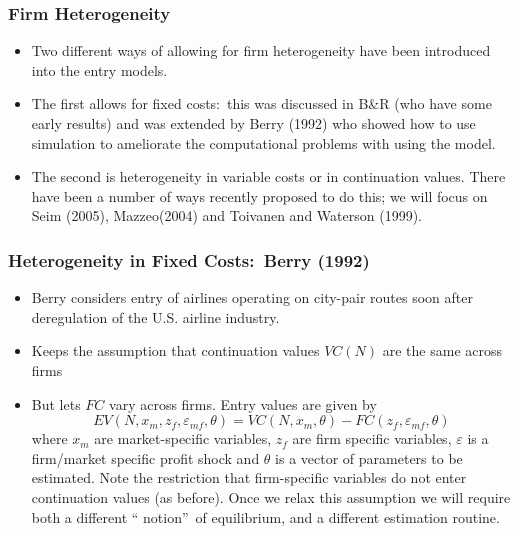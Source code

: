 \documentclass[aspectratio=169,11pt]{beamer}
\begin{document}
\begin{frame}
\frametitle{Firm Heterogeneity}
\begin{itemize}
\item Two different ways of allowing for firm heterogeneity have been
introduced into the entry models.

\item The first allows for fixed costs:\ this was discussed in B\&R (who
have some early results) and was extended by Berry (1992) who showed how to
use simulation to ameliorate the computational problems with using the model.

\item The second is heterogeneity in variable costs or in continuation
values. There have been a number of ways recently proposed to do this; we
will focus on Seim (2005), Mazzeo(2004) and Toivanen and Waterson (1999).
\end{itemize}
\end{frame}%
\begin{frame}%

\frametitle{Heterogeneity in Fixed Costs:\ Berry (1992)}

\begin{itemize}
\item Berry considers entry of airlines operating on city-pair routes soon
after deregulation of the U.S. airline industry.

\item Keeps the assumption that continuation values $VC(N)$ are the same
across firms

\item But lets $FC$ vary across firms. Entry values are given by 
\begin{equation}
EV(N,x_{m},z_{f},\varepsilon _{mf},\theta )=VC(N,x_{m},\theta
)-FC(z_{f},\varepsilon _{mf},\theta )  \label{entry5}
\end{equation}%
where $x_{m}$ are market-specific variables, $z_{f}$ are firm specific
variables, $\varepsilon $ is a firm/market specific profit shock and $\theta 
$ is a vector of parameters to be estimated. Note the restriction that
firm-specific variables do not enter continuation values (as before). Once
we relax this assumption we will require both a different \textquotedblleft
notion\textquotedblright\ of equilibrium, and a different estimation routine.
\end{itemize}
\end{frame}
\end{document}
